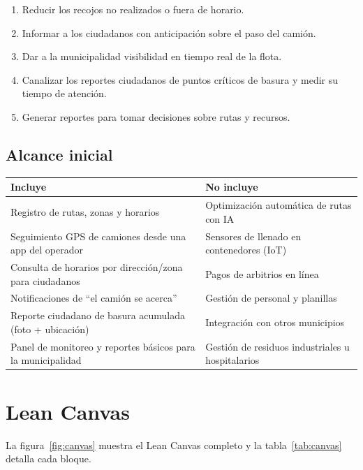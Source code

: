 \documentclass[11pt,a4paper]{article}
\begin{document}
\begin{enumerate}
  \item Reducir los recojos no realizados o fuera de horario.
  \item Informar a los ciudadanos con anticipación sobre el paso del camión.
  \item Dar a la municipalidad visibilidad en tiempo real de la flota.
  \item Canalizar los reportes ciudadanos de puntos críticos de basura y medir su tiempo de atención.
  \item Generar reportes para tomar decisiones sobre rutas y recursos.
\end{enumerate}

\subsection{Alcance inicial}

\begin{center}
\begin{tabular}{L{7.6cm} L{7.6cm}}
\toprule
\textbf{Incluye} & \textbf{No incluye} \\
\midrule
Registro de rutas, zonas y horarios & Optimización automática de rutas con IA \\
Seguimiento GPS de camiones desde una app del operador & Sensores de llenado en contenedores (IoT) \\
Consulta de horarios por dirección/zona para ciudadanos & Pagos de arbitrios en línea \\
Notificaciones de ``el camión se acerca'' & Gestión de personal y planillas \\
Reporte ciudadano de basura acumulada (foto + ubicación) & Integración con otros municipios \\
Panel de monitoreo y reportes básicos para la municipalidad & Gestión de residuos industriales u hospitalarios \\
\bottomrule
\end{tabular}
\end{center}

\section{Lean Canvas}

La figura~\ref{fig:canvas} muestra el Lean Canvas completo y la tabla~\ref{tab:canvas} detalla cada bloque.
\end{document}
